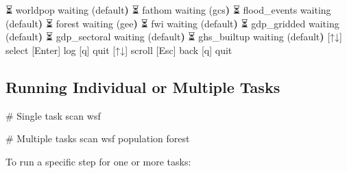 \documentclass[
  letterpaper,
  DIV=11,
  numbers=noendperiod]{scrreprt}
\newenvironment{Shaded}{\begin{snugshade}}{\end{snugshade}}
\newcommand{\CommentTok}[1]{\textcolor[rgb]{0.37,0.37,0.37}{#1}}
\newcommand{\ErrorTok}[1]{\textcolor[rgb]{0.68,0.00,0.00}{#1}}
\newcommand{\ExtensionTok}[1]{\textcolor[rgb]{0.00,0.23,0.31}{#1}}
\newcommand{\KeywordTok}[1]{\textcolor[rgb]{0.00,0.23,0.31}{\textbf{#1}}}
\newcommand{\NormalTok}[1]{\textcolor[rgb]{0.00,0.23,0.31}{#1}}
\newcommand{\PreprocessorTok}[1]{\textcolor[rgb]{0.68,0.00,0.00}{#1}}
\newcommand{\SpecialStringTok}[1]{\textcolor[rgb]{0.13,0.47,0.30}{#1}}
\begin{document}
\begin{Shaded}
\begin{Highlighting}[]
 \ExtensionTok{⏳}\NormalTok{ worldpop                    waiting }\ErrorTok{(}\ExtensionTok{default}\KeywordTok{)}                                    
 \ExtensionTok{⏳}\NormalTok{ fathom                      waiting }\ErrorTok{(}\ExtensionTok{gcs}\KeywordTok{)}                                        
 \ExtensionTok{⏳}\NormalTok{ flood\_events                waiting }\ErrorTok{(}\ExtensionTok{default}\KeywordTok{)}                                    
 \ExtensionTok{⏳}\NormalTok{ forest                      waiting }\ErrorTok{(}\ExtensionTok{gee}\KeywordTok{)}                                        
 \ExtensionTok{⏳}\NormalTok{ fwi                         waiting }\ErrorTok{(}\ExtensionTok{default}\KeywordTok{)}                                    
 \ExtensionTok{⏳}\NormalTok{ gdp\_gridded                 waiting }\ErrorTok{(}\ExtensionTok{default}\KeywordTok{)}                                    
 \ExtensionTok{⏳}\NormalTok{ gdp\_sectoral                waiting }\ErrorTok{(}\ExtensionTok{default}\KeywordTok{)}                                    
 \ExtensionTok{⏳}\NormalTok{ ghs\_builtup                 waiting }\ErrorTok{(}\ExtensionTok{default}\KeywordTok{)}                                    
 \ExtensionTok{[↑↓]}\NormalTok{ select  }\PreprocessorTok{[}\SpecialStringTok{Enter}\PreprocessorTok{]}\NormalTok{ log  }\PreprocessorTok{[}\SpecialStringTok{q}\PreprocessorTok{]}\NormalTok{ quit}
 \ExtensionTok{[↑↓]}\NormalTok{ scroll  }\PreprocessorTok{[}\SpecialStringTok{Esc}\PreprocessorTok{]}\NormalTok{ back  }\PreprocessorTok{[}\SpecialStringTok{q}\PreprocessorTok{]}\NormalTok{ quit}
\end{Highlighting}
\end{Shaded}

\subsection{Running Individual or Multiple
Tasks}\label{running-individual-or-multiple-tasks}

\begin{Shaded}
\begin{Highlighting}[]
\CommentTok{\# Single task}
\ExtensionTok{scan}\NormalTok{ wsf}

\CommentTok{\# Multiple tasks}
\ExtensionTok{scan}\NormalTok{ wsf population forest}
\end{Highlighting}
\end{Shaded}

To run a specific step for one or more tasks:
\end{document}

